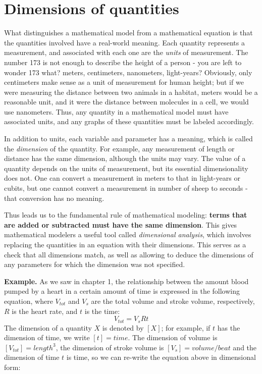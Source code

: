 \documentclass[
]{book}
\begin{document}
\hypertarget{sec:model2}{%
\section{Dimensions of quantities}\label{sec:model2}}

What distinguishes a mathematical model from a mathematical equation is that the quantities involved have a real-world meaning. Each quantity represents a measurement, and associated with each one are the  \emph{units} of measurement. The number 173 is not enough to describe the height of a person - you are left to wonder 173 what? meters, centimeters, nanometers, light-years? Obviously, only centimeters make sense as a unit of measurement for human height; but if we were measuring the distance between two animals in a habitat, meters would be a reasonable unit, and it were the distance between molecules in a cell, we would use nanometers. Thus, any quantity in a mathematical model must have associated units, and any graphs of these quantities must be labeled accordingly.

In addition to units, each variable and parameter has a meaning, which is called the  \emph{dimension} of the quantity. For example, any measurement of length or distance has the same dimension, although the units may vary. The value of a quantity depends on the units of measurement, but its essential dimensionality does not. One can convert a measurement in meters to that in light-years or cubits, but one cannot convert a measurement in number of sheep to seconds - that conversion has no meaning.

Thus leads us to the fundamental rule of mathematical modeling: \textbf{terms that are added or subtracted must have the same dimension}. This gives mathematical modelers a useful tool called  \emph{dimensional analysis}, which involves replacing the quantities in an equation with their dimensions. This serves as a check that all dimensions match, as well as allowing to deduce the dimensions of any parameters for which the dimension was not specified. \citep{smith_mathematical_1968}

\textbf{Example.} As we saw in chapter 1, the relationship between the amount blood pumped by a heart in a certain amount of time is expressed in the following equation, where \(V_{tot}\) and \(V_s\) are the total volume and stroke volume, respectively, \(R\) is the heart rate, and \(t\) is the time:
\[
V_{tot} = V_sRt
\]
The dimension of a quantity \(X\) is denoted by \([X]\); for example, if \(t\) has the dimension of time, we write \([t] = time\). The dimension of volume is \([V_{tot}] = length^3\), the dimension of stroke volume is \([V_s] = volume/beat\) and the dimension of time \(t\) is time, so we can re-write the equation above in dimensional form:
\end{document}
